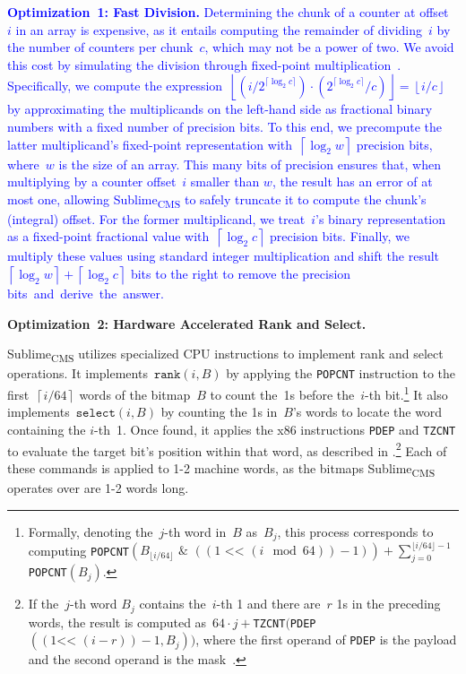 \documentclass[sigconf]{acmart}
\newcommand{\sketch}{Sublime}
\newcommand{\sketchcms}{\sketch\textsubscript{CMS}\xspace}
\begin{document}
\textcolor{blue}{
\hypertarget{optimization:fast_division}{\textbf{Optimization~1: Fast Division.}}
Determining the chunk of a counter at offset~$i$ in an array is expensive, as
it entails computing the remainder of dividing~$i$ by the number of counters
per chunk~$c$, which may not be a power of two. We avoid this cost by
simulating the division through fixed-point
multiplication~\cite{HackersDelight}. Specifically, we compute the
expression~$\left\lfloor \left(i/2^{\lceil \log_2 c \rceil}\right) \cdot
\left(2^{\lceil \log_2 c \rceil}/c\right) \right\rfloor = \left\lfloor i/c
\right\rfloor$ by approximating the multiplicands on the left-hand side as
fractional binary numbers with a fixed number of precision bits. To this end,
we precompute the latter multiplicand's fixed-point representation
with~$\left\lceil \log_2 w \right\rceil$ precision bits, where~$w$ is the size
of an array. This many bits of precision ensures that, when multiplying by a
counter offset~$i$ smaller than $w$, the result has an error of at most one,
allowing \sketchcms to safely truncate it to compute the chunk's (integral)
offset. For the former multiplicand, we treat~$i$'s binary representation as a
fixed-point fractional value with~$\left\lceil \log_2 c \right\rceil$ precision
bits. Finally, we multiply these values using standard integer multiplication
and shift the result~$\left\lceil \log_2 w \right\rceil + \left\lceil \log_2 c
\right\rceil$ bits to the right to remove the precision
bits~and~derive~the~answer.
}

\hypertarget{optimization:rank_and_select}{\textbf{Optimization~2: Hardware Accelerated Rank and Select.}}
\sketchcms utilizes specialized CPU instructions to implement rank and select
operations. It implements~$\texttt{rank}(i,B)$ by applying the \verb|POPCNT|
instruction to the first~$\left\lceil i/64 \right\rceil$ words of the
bitmap~$B$ to count the~1s before the~$i${\nobreakdash-}th
bit.\footnote{Formally, denoting the~$j${\nobreakdash-}th word in~$B$ as~$B_j$,
this process corresponds to computing \texttt{POPCNT}$ \left(B_{\lfloor i/64
\rfloor}\text{~\&~}((1 \text{ <‌< } (i \mod 64))-1) \right) +
\sum_{j=0}^{\lfloor i/64 \rfloor -1}$ \texttt{POPCNT}$(B_j)$.} It also
implements~$\texttt{select}(i,B)$ by counting the 1s
in~$B$'s words to locate the word containing the $i${\nobreakdash-}th~1. Once
found, it applies the x86 instructions \verb|PDEP| and \verb|TZCNT| to evaluate
the target bit's position within that word, as described in
\cite{GQF}.\footnote{If the~$j${\nobreakdash-}th word $B_j$ contains
the~$i${\nobreakdash-}th 1 and there are~$r$ 1s in the preceding words, the
result is computed as~$64 \cdot j + $\texttt{TZCNT}$($\texttt{PDEP}$((1 \text{
<‌< } (i-r)) - 1, B_j))$, where the first operand of \texttt{PDEP} is the
payload and the second operand is the mask~\cite{PDEP}.} Each of these commands
is applied to 1-2 machine words, as the bitmaps \sketchcms operates over are
1-2 words long.
\end{document}
